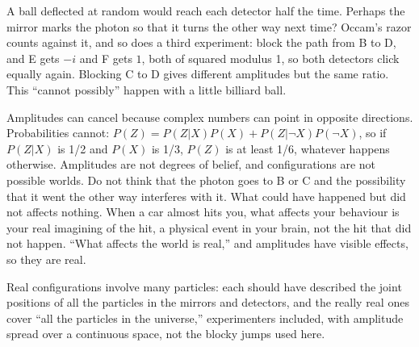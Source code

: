A ball deflected at random would reach each detector half the time. Perhaps the mirror marks the photon so that it turns the other way next time? Occam's razor counts against it, and so does a third experiment: block the path from B to D, and E gets $-i$ and F gets $1$, both of squared modulus 1, so both detectors click equally again. Blocking C to D gives different amplitudes but the same ratio.  This ``cannot possibly'' happen with a little billiard ball. 

Amplitudes can cancel because complex numbers can point in opposite directions. Probabilities cannot: $P(Z)=P(Z|X)P(X)+P(Z|\neg X)P(\neg X)$, so if $P(Z|X)$ is 1/2 and $P(X)$ is 1/3, $P(Z)$ is at least 1/6, whatever happens otherwise. Amplitudes are not degrees of belief, and configurations are not possible worlds. Do not think that the photon goes to B or C and the possibility that it went the other way interferes with it. What could have happened but did not affects nothing. When a car almost hits you, what affects your behaviour is your real imagining of the hit, a physical event in your brain, not the hit that did not happen. ``What affects the world is real,'' and amplitudes have visible effects, so they are real. 

Real configurations involve many particles: each should have described the joint positions of all the particles in the mirrors and detectors, and the really real ones cover ``all the particles in the universe,'' experimenters included, with amplitude spread over a continuous space, not the blocky jumps used here. 
